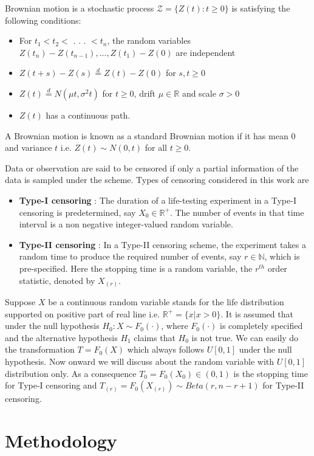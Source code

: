 \documentclass[12pt, reqno]{amsart}
\begin{document}
Brownian motion is a  stochastic process $\mathcal{Z} =\{ Z(t): t \geq 0 \}$ is satisfying the following conditions:
\begin{itemize}
    \item For $t_{1} < t_{2} <$ . . . $< t_{n}$, the random variables $Z(t_{n}) - Z( t_{n-1}), . . . ,Z( t_{1} )- Z(0)$ are independent
    \item  $Z(t + s) - Z(s) \stackrel{d}{=} Z(t) - Z(0)$ for $ s, t \geq 0$
    \item $Z(t) \stackrel{d}{=} N(\mu t, \sigma ^2 t) $ for $t \geq 0$, drift $\mu \in \mathbb{R}$ and scale $\sigma > 0$
    \item  $Z(t)$ has a continuous path. 
\end{itemize}
A Brownian motion is known as a standard Brownian motion if it has mean $0$ and variance $t$ i.e. $Z(t) \sim N(0,t)$ for all $t \geq 0$.


Data or observation are said to be censored if only a partial information of the data is sampled under the scheme. Types of censoring considered in this work are 
    \begin{itemize}
        \item \textbf{Type-I censoring }: The duration of a life-testing experiment in a Type-I censoring is predetermined, say $X_{0}\in \mathbb{R}^+ $. The number of events in that time interval is a non negative integer-valued random variable.
        \item \textbf{Type-II censoring }: In a Type-II censoring scheme, the experiment takes a random time to produce the required number of events, say $r \in \mathbb{N}$, which is pre-specified. Here the stopping time is a random variable, the $r^{th}$ order statistic, denoted by $X_{(r)}$.
    \end{itemize}
Suppose $X$ be a continuous  random variable stands for the life distribution supported on positive part of real line i.e. $\mathbb{R}^+=\{x| x>0\}.$ It is assumed that under  the null hypothesis $H_0: X\sim F_0(\cdot)$,  where $F_0(\cdot)$ is completely  specified and  the alternative hypothesis $H_1$ claims that $H_0$ is not true. We can easily do the transformation $T=F_0(X)$ which always follows $U[0,1]$ under the null hypothesis.   Now onward we will discuss about the random variable with $U[0,1]$ distribution only. As a consequence $T_0=F_0(X_0)\in (0,1)$ is the stopping time for Type-I censoring and $T_{(r)}= F_0(X_{(r)})\sim Beta(r, n-r+1)$ for Type-II censoring. 

\section{Methodology}
\end{document}
